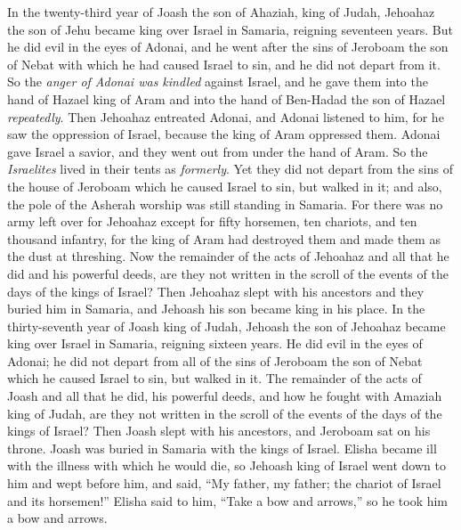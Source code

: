 \begin{biblechapter} %
 In the twenty-third year of Joash the son of Ahaziah, king of Judah, Jehoahaz the son of Jehu became king over Israel in Samaria, reigning seventeen years.
\verse But he did evil in the eyes of Adonai, and he went after the sins of Jeroboam the son of Nebat with which he had caused Israel to sin, and he did not depart from it.
\verse So the \textit{anger of Adonai was kindled} against Israel, and he gave them into the hand of Hazael king of Aram and into the hand of Ben-Hadad the son of Hazael \textit{repeatedly}.
\verse Then Jehoahaz entreated Adonai, and Adonai listened to him, for he saw the oppression of Israel, because the king of Aram oppressed them.
\verse Adonai gave Israel a savior, and they went out from under the hand of Aram. So the \textit{Israelites} lived in their tents as \textit{formerly}.
\verse Yet they did not depart from the sins of the house of Jeroboam which he caused Israel to sin, but walked in it; and also, the pole of the Asherah worship was still standing in Samaria.
\verse For there was no army left over for Jehoahaz except for fifty horsemen, ten chariots, and ten thousand infantry, for the king of Aram had destroyed them and made them as the dust at threshing.
\verse Now the remainder of the acts of Jehoahaz and all that he did and his powerful deeds, are they not written in the scroll of the events of the days of the kings of Israel?
\verse Then Jehoahaz slept with his ancestors and they buried him in Samaria, and Jehoash his son became king in his place.
\verse In the thirty-seventh year of Joash king of Judah, Jehoash the son of Jehoahaz became king over Israel in Samaria, reigning sixteen years.
\verse He did evil in the eyes of Adonai; he did not depart from all of the sins of Jeroboam the son of Nebat which he caused Israel to sin, but walked in it.
\verse The remainder of the acts of Joash and all that he did, his powerful deeds, and how he fought with Amaziah king of Judah, are they not written in the scroll of the events of the days of the kings of Israel?
\verse Then Joash slept with his ancestors, and Jeroboam sat on his throne. Joash was buried in Samaria with the kings of Israel.
 Elisha became ill with the illness with which he would die, so Jehoash king of Israel went down to him and wept before him, and said, “My father, my father; the chariot of Israel and its horsemen!”
\verse Elisha said to him, “Take a bow and arrows,” so he took him a bow and arrows.

\end{biblechapter}
